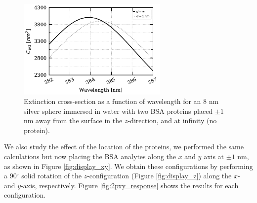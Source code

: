 \begin{figure} %
    \centering
    \includegraphics[width=0.65\textwidth]{2pz_R8nm.pdf} 
    \caption{Extinction cross-section as a function of wavelength for an $8$ nm
             silver sphere immersed in water with two BSA proteins placed 
             $\pm 1$ nm away from the surface in the $z$-direction, and at
             infinity (no protein).}
    \label{fig:2pz_response}
 \end{figure}

 We also study the effect of the location of the proteins, we performed the same 
 calculations but now placing the BSA analytes along the $x$ and $y$ axis at $\pm 1$ nm,
 as shown in Figure \ref{fig:display_xy}. We obtain these configurations by performing
 a 90$^\circ$ solid rotation of the $z$-configuration (Figure \ref{fig:display_z})
 along the $x$- and $y$-axis, respectively. Figure \ref{fig:2pxy_response} shows the results for each 
 configuration.



